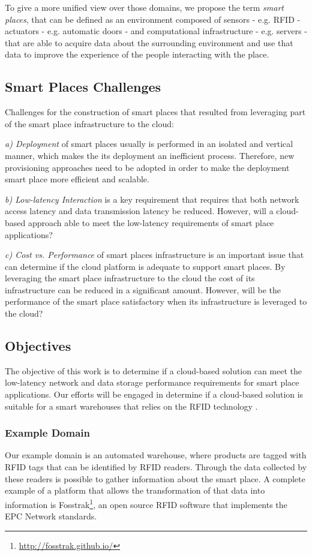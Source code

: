 To give a more unified view over those domains, we propose the term \textit{smart places},
that can be defined as an environment composed of sensors - e.g. RFID - actuators - e.g. automatic
doors - and computational infrastructure - e.g. servers - that are able to acquire data about the
surrounding environment and use that data to improve the experience of the people interacting with
the place.

\subsection{Smart Places Challenges}
\label{sub:challenges}
Challenges \cite{caceres2012ubicomp} for the construction of smart places that resulted from leveraging
part of the smart place infrastructure to the cloud:

\textit{a) Deployment} of smart places usually is performed in an isolated and vertical manner, which
makes the its deployment an inefficient process. Therefore, new provisioning approaches need to be
adopted in order to make the deployment smart place more efficient and scalable.

\textit{b) Low-latency Interaction} is a key requirement that requires that both network access
latency and data transmission latency be reduced. However, will a cloud-based
approach able to meet the low-latency requirements of smart place applications?

\textit{c) Cost vs. Performance} of smart places infrastructure is an important issue
that can determine if the cloud platform is adequate to support smart places. By
leveraging the smart place infrastructure to the cloud the cost of its infrastructure
can be reduced in a significant amount. However, will be the performance of the
smart place satisfactory when its infrastructure is leveraged to the cloud?

\subsection{Objectives}
\label{sub:objectives}
The objective of this work is to determine if a cloud-based solution can meet the low-latency network
and data storage performance requirements for smart place applications. Our efforts will be engaged in
determine if a cloud-based solution is suitable for a smart warehouses that relies on the RFID technology
\cite{want2006introduction}.

\subsubsection{Example Domain}
\label{subs:domain}
Our example domain is an automated warehouse, where products are tagged with \gls{RFID} tags that
can be identified by \gls{RFID} readers. Through the data collected by these readers is possible to
gather information about the smart place. A complete example of a platform that allows the transformation
of that data into information is Fosstrak\footnote{\url{http://fosstrak.github.io/}}, an open
source \gls{RFID} software that implements the \gls{EPC} Network standards.

